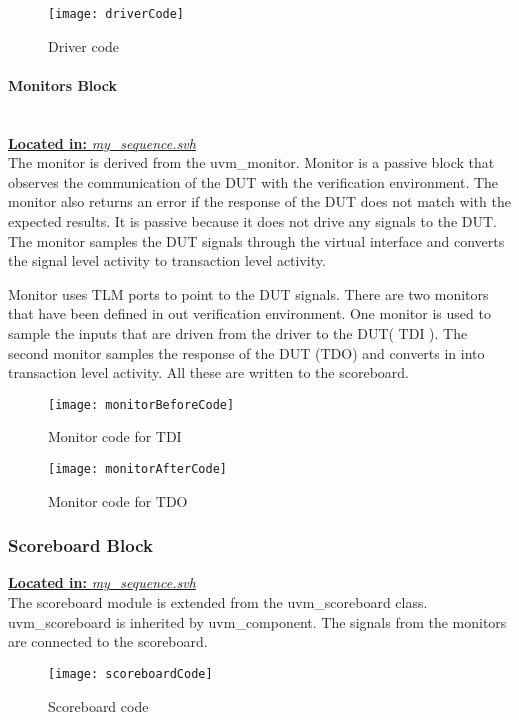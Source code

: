 \documentclass[a4paper,11pt]{article}
\begin{document}
\begin{figure}[ht]
\centering
\texttt{[image: driverCode]}
\caption{Driver code}
\end{figure}


\FloatBarrier
\paragraph{Monitors Block}\mbox{}\\
\underline{\textbf{Located in:} \textit{my\_sequence.svh}}\\
The monitor is derived from the uvm\_monitor. Monitor is a passive block that observes the communication of the DUT with the verification environment. The monitor also returns an error if the response of the DUT does not match with the expected results. It is passive because it does not drive any signals to the DUT. The monitor samples the DUT signals through the virtual interface and converts the signal level activity to transaction level activity.

Monitor uses TLM ports to point to the DUT signals. There are two monitors that have been defined in out verification environment. One monitor is used to sample the inputs that are driven from the driver to the DUT( TDI ). The second monitor samples the response of the DUT (TDO) and converts in into transaction level activity. All these are written to the scoreboard.


\begin{figure}[ht]
\centering
\texttt{[image: monitorBeforeCode]}
\caption{Monitor code for TDI}
\end{figure}

\begin{figure}[ht]
\centering
\texttt{[image: monitorAfterCode]}
\caption{Monitor code for TDO}
\end{figure}

\FloatBarrier
\subsubsection{Scoreboard Block}
\underline{\textbf{Located in:} \textit{my\_sequence.svh}}\\

The scoreboard module is extended from the uvm\_scoreboard class. uvm\_scoreboard is inherited by uvm\_component. The signals from the monitors are connected to the scoreboard.
\begin{figure}[ht]
\centering
\texttt{[image: scoreboardCode]}
\caption{Scoreboard code}
\end{figure}
\end{document}
